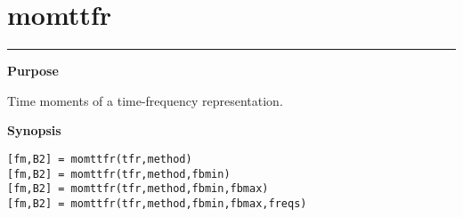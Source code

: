 

\section*{\hspace*{-1.6cm} momttfr}

\vspace*{-.4cm}
\hspace*{-1.6cm}\rule[0in]{16.5cm}{.02cm}
\vspace*{.2cm}



{\bf \large \sf Purpose}\\
\hspace*{1.5cm}
\begin{minipage}[t]{13.5cm}
Time moments of a time-frequency representation.
\end{minipage}
\vspace*{.5cm}


{\bf \large \sf Synopsis}\\
\hspace*{1.5cm}
\begin{minipage}[t]{13.5cm}
\begin{verbatim}
[fm,B2] = momttfr(tfr,method)
[fm,B2] = momttfr(tfr,method,fbmin)
[fm,B2] = momttfr(tfr,method,fbmin,fbmax)
[fm,B2] = momttfr(tfr,method,fbmin,fbmax,freqs)
\end{verbatim}
\end{minipage}
\vspace*{.5cm}


